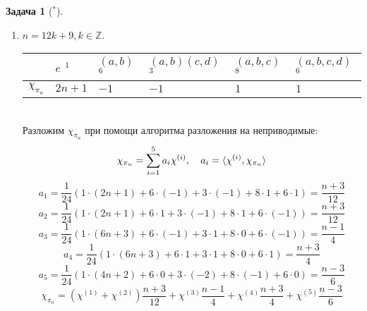 \documentclass[12pt]{article}
\theoremstyle{definition}
\newtheorem{zad}{Задача}[section]
\begin{document}
\begin{zad}[$^*$]
\begin{itemize}
\begin{enumerate}
    \item $n=12k+9,k\in\mathbb{Z}$.
    \begin{table}[h!]
    \centering
    \begin{tabular}{|l|l|l|l|l|l|}
    \hline
     & $e$ $^1$ & $(a,b)$ $^6$ & $(a,b)(c,d)$ $^3$ & $(a,b,c)$ $^8$ & $(a,b,c,d)$ $^6$ \\ \hline
    $\chi_{\pi_n}$ & $2n+1$ & $-1$ & $-1$ & $1$ & $1$ \\ \hline
    \end{tabular}
    \end{table}\\
    Разложим $\chi_{\pi_n}$ при помощи алгоритма разложения на неприводимые:
    \begin{equation}
        \chi_{\pi_n}=\sum\limits_{i=1}^5 a_i\chi^{(i)},\quad a_i=\braket{\chi^{(i)},\chi_{\pi_n}}
    \end{equation}
    \begin{equation}
        a_1=\frac{1}{24}(1\cdot(2n+1)+6\cdot(-1)+3\cdot(-1)+8\cdot1+6\cdot1)=\frac{n+3}{12}
    \end{equation}
    \begin{equation}
        a_2=\frac{1}{24}(1\cdot(2n+1)+6\cdot1+3\cdot(-1)+8\cdot1+6\cdot(-1))=\frac{n+3}{12}
    \end{equation}
    \begin{equation}
        a_3=\frac{1}{24}(1\cdot(6n+3)+6\cdot(-1)+3\cdot1+8\cdot0+6\cdot(-1))=\frac{n-1}{4}
    \end{equation}
    \begin{equation}
        a_4=\frac{1}{24}(1\cdot(6n+3)+6\cdot1+3\cdot1+8\cdot0+6\cdot1)=\frac{n+3}{4}
    \end{equation}
    \begin{equation}
        a_5=\frac{1}{24}(1\cdot(4n+2)+6\cdot0+3\cdot(-2)+8\cdot(-1)+6\cdot0)=\frac{n-3}{6}
    \end{equation}
    \begin{equation}
        \boxed{\chi_{\pi_n}=(\chi^{(1)}+\chi^{(2)})\frac{n+3}{12}+\chi^{(3)}\frac{n-1}{4}+\chi^{(4)}\frac{n+3}{4}+\chi^{(5)}\frac{n-3}{6}}
    \end{equation}
    

\end{enumerate}
\end{itemize}
\end{zad}
\end{document}
